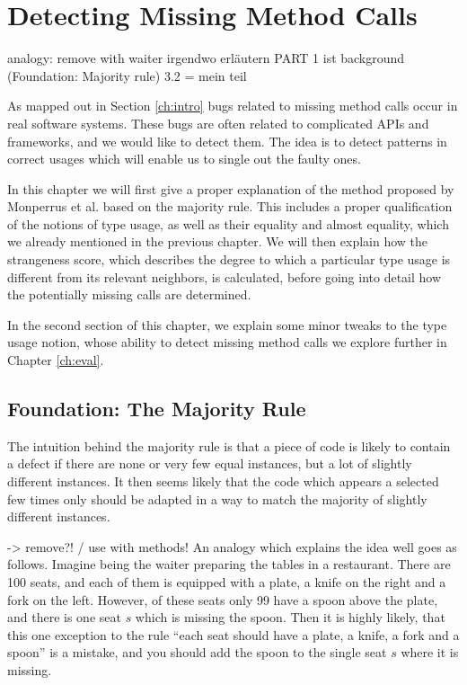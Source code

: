 \chapter{Detecting Missing Method Calls}\label{ch:dmmc}

analogy: remove with waiter
irgendwo erläutern PART 1 ist background (Foundation: Majority rule)
3.2 = mein teil


As mapped out in Section \ref{ch:intro} bugs related to missing method calls occur in real software systems.
These bugs are often related to complicated APIs and frameworks, and we would like to detect them.
The idea is to detect patterns in correct usages which will enable us to single out the faulty ones.

In this chapter we will first give a proper explanation of the method proposed by Monperrus et al. \cite{monperrus2010detecting}\cite{monperrus2013detecting} based on the majority rule.
This includes a proper qualification of the notions of type usage, as well as their equality and almost equality, which we already mentioned in the previous chapter.
We will then explain how the strangeness score, which describes the degree to which a particular type usage is different from its relevant neighbors, is calculated, before going into detail how the potentially missing calls are determined.

In the second section of this chapter, we explain some minor tweaks to the type usage notion, whose ability to detect missing method calls we explore further in Chapter \ref{ch:eval}.

\section{Foundation: The Majority Rule}

The intuition behind the majority rule is that a piece of code is likely to contain a defect if there are none or very few equal instances, but a lot of slightly different instances.
It then seems likely that the code which appears a selected few times only should be adapted in a way to match the majority of slightly different instances.

-> remove?! / use with methods!
An analogy which explains the idea well goes as follows.
Imagine being the waiter preparing the tables in a restaurant.
There are 100 seats, and each of them is equipped with a plate, a knife on the right and a fork on the left.
However, of these seats only 99 have a spoon above the plate, and there is one seat $s$ which is missing the spoon.
Then it is highly likely, that this one exception to the rule ``each seat should have a plate, a knife, a fork and a spoon'' is a mistake, and you should add the spoon to the single seat $s$ where it is missing.

